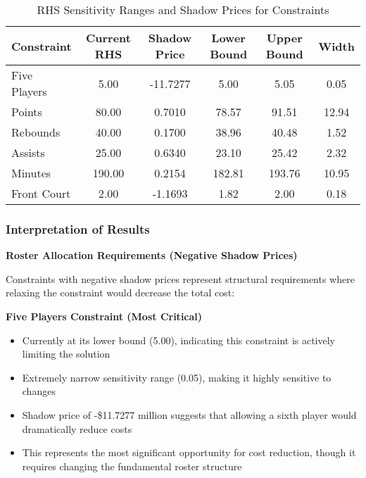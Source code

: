 \documentclass[a4paper,11pt]{article}
\newcommand{\vsp}{\vspace{0.5em}}
\begin{document}
\begin{table}[h!]
    \centering
    \label{tab:rhs_sensitivity_lp}
    \begin{tabular}{lccccc}
        \hline
        \textbf{Constraint} & \textbf{Current RHS} & \textbf{Shadow Price} & \textbf{Lower Bound} & \textbf{Upper Bound} & \textbf{Width} \\
        \hline
        Five Players        & 5.00                 & -11.7277              & 5.00                 & 5.05                 & 0.05                 \\
        Points              & 80.00                & 0.7010                & 78.57                & 91.51                & 12.94                \\
        Rebounds            & 40.00                & 0.1700                & 38.96                & 40.48                & 1.52                 \\
        Assists             & 25.00                & 0.6340                & 23.10                & 25.42                & 2.32                 \\
        Minutes             & 190.00               & 0.2154                & 182.81               & 193.76               & 10.95                \\
        Front Court         & 2.00                 & -1.1693               & 1.82                 & 2.00                 & 0.18                 \\
        \hline
    \end{tabular}
    \caption{RHS Sensitivity Ranges and Shadow Prices for Constraints}
\end{table}

\subsubsection{Interpretation of Results}

\textbf{Roster Allocation Requirements (Negative Shadow Prices)}

Constraints with negative shadow prices represent structural requirements where relaxing the constraint would decrease the total cost:

\vsp

\textbf{Five Players Constraint (Most Critical)}
\begin{itemize}
    \item Currently at its lower bound (5.00), indicating this constraint is actively limiting the solution
    \item Extremely narrow sensitivity range (0.05), making it highly sensitive to changes
    \item Shadow price of -\$11.7277 million suggests that allowing a sixth player would dramatically reduce costs
    \item This represents the most significant opportunity for cost reduction, though it requires changing the fundamental roster structure
\end{itemize}
\end{document}
